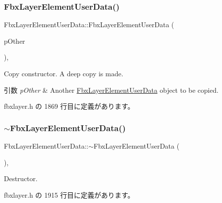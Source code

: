 \subsubsection{\texorpdfstring{Fbx\+Layer\+Element\+User\+Data()}{FbxLayerElementUserData()}\hspace{0.1cm}{\footnotesize\ttfamily [2/2]}}
{\footnotesize\ttfamily Fbx\+Layer\+Element\+User\+Data\+::\+Fbx\+Layer\+Element\+User\+Data (\begin{DoxyParamCaption}\item[{\hyperlink{class_fbx_layer_element_user_data}{Fbx\+Layer\+Element\+User\+Data} const \&}]{p\+Other }\end{DoxyParamCaption})\hspace{0.3cm}{\ttfamily [inline]}, {\ttfamily [protected]}}

Copy constructor. A deep copy is made. 
\begin{DoxyParams}{引数}
{\em p\+Other} & Another \hyperlink{class_fbx_layer_element_user_data}{Fbx\+Layer\+Element\+User\+Data} object to be copied. \\
\hline
\end{DoxyParams}


 fbxlayer.\+h の 1869 行目に定義があります。

\mbox{\label{class_fbx_layer_element_user_data_a77cda3570c8b9d92d8c5360c008bdca2}} 
\subsubsection{\texorpdfstring{$\sim$\+Fbx\+Layer\+Element\+User\+Data()}{~FbxLayerElementUserData()}}
{\footnotesize\ttfamily Fbx\+Layer\+Element\+User\+Data\+::$\sim$\+Fbx\+Layer\+Element\+User\+Data (\begin{DoxyParamCaption}{ }\end{DoxyParamCaption})\hspace{0.3cm}{\ttfamily [inline]}, {\ttfamily [protected]}}



Destructor. 



 fbxlayer.\+h の 1915 行目に定義があります。



